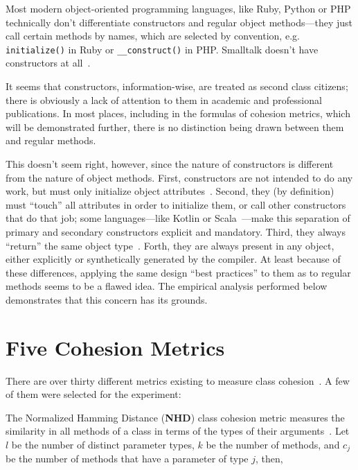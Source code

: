 \documentclass[conference]{IEEEtran}
\newcommand{\code}[1]{\texttt{#1}}
\begin{document}
Most modern object-oriented programming languages, like Ruby, Python or PHP
technically don't differentiate constructors and regular object methods---they
just call certain methods by names, which are selected by convention, e.g.
\code{initialize()} in Ruby or \code{\_\_construct()} in PHP.
Smalltalk doesn't have constructors at all~\cite{goldberg83}.

It seems that constructors, information-wise, are treated as second class citizens;
there is obviously a lack of attention to them in academic and professional publications.
In most places, including in the formulas of cohesion metrics,
which will be demonstrated further, there is no distinction being drawn between
them and regular methods.

This doesn't seem right, however, since the nature of constructors is different from the nature of object methods.
First, constructors are not intended to do any work, but must only initialize object attributes~\cite{bugayenko16}.
Second, they (by definition) must ``touch'' all attributes in order to initialize them,
or call other constructors that do that job; some languages---like Kotlin or Scala~\cite{odersky14}---make
this separation of primary and secondary constructors explicit and mandatory.
Third, they always ``return'' the same object type~\cite{bloch18}.
Forth, they are always present in any object, either explicitly or synthetically generated by the compiler.
At least because of these differences, applying the same design ``best practices'' to them as to regular methods
seems to be a flawed idea.
The empirical analysis performed below demonstrates that this concern has its grounds.

\section{Five Cohesion Metrics}

There are over thirty different metrics existing to measure
class cohesion~\cite{izadkhah17}. A few of them were selected
for the experiment:

The Normalized Hamming Distance (\textbf{NHD}) class cohesion metric
measures the similarity in all methods of a class in terms of
the types of their arguments~\cite{counsell06}. Let $l$ be the number of
distinct parameter types, $k$ be the number of methods,
and $c_j$ be the number of methods that have a parameter of type $j$,
then,
\end{document}

